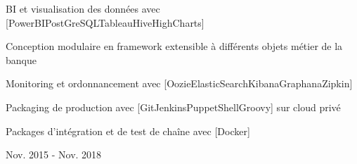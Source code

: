 \begin{cventries}
{\begin{cvsubentries}
{\begin{cvitems}
	\item {BI et visualisation des données avec [PowerBI{\enskip\cdotp\enskip}PostGreSQL{\enskip\cdotp\enskip}Tableau{\enskip\cdotp\enskip}Hive{\enskip\cdotp\enskip}HighCharts]}
	\item {Conception modulaire en framework extensible à différents objets métier de la banque}
	\item {Monitoring et ordonnancement avec [\scriptsize Oozie{\enskip\cdotp\enskip}ElasticSearch{\enskip\cdotp\enskip}Kibana{\enskip\cdotp\enskip}Graphana{\enskip\cdotp\enskip}Zipkin] }
	\item {Packaging de production avec [Git{\enskip\cdotp\enskip}Jenkins{\enskip\cdotp\enskip}Puppet{\enskip\cdotp\enskip}Shell{\enskip\cdotp\enskip}Groovy] sur cloud privé}
	\item {Packages d'intégration et de test de chaîne avec [Docker]}
\end{cvitems}
}{Nov. 2015 - Nov. 2018}{}
\end{cvsubentries}
}



\end{cventries}
